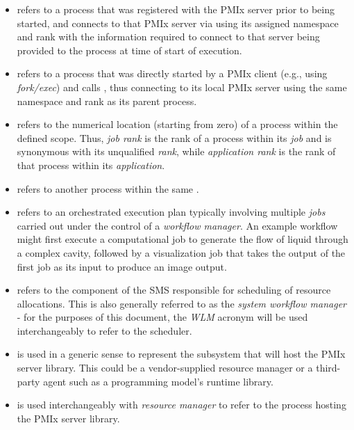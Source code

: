 \begin{itemize}
\item {} refers to a process that was registered with the \ac{PMIx} server prior to being started, and connects to that \ac{PMIx} server via  using its assigned namespace and rank with the information required to connect to that server being provided to the process at time of start of execution.

\item {} refers to a process that was directly started by a \ac{PMIx} client (e.g., using \emph{fork/exec}) and calls , thus connecting to its local \ac{PMIx} server using the same namespace and rank as its parent process.

\item {} refers to the numerical location (starting from zero) of a process within the defined scope. Thus, \emph{job rank} is the rank of a process within its \emph{job} and is synonymous with its unqualified \emph{rank}, while \emph{application rank} is the rank of that process within its \emph{application}.

\item {} refers to another process within the same .

\item {} refers to an orchestrated execution plan typically involving multiple \emph{jobs} carried out under the control of a \emph{workflow manager}. An example workflow might first execute a computational job to generate the flow of liquid through a complex cavity, followed by a visualization job that takes the output of the first job as its input to produce an image output.

\item {} refers to the component of the \ac{SMS} responsible for scheduling of resource allocations. This is also generally referred to as the \emph{system workflow manager} - for the purposes of this document, the \emph{WLM} acronym will be used interchangeably to refer to the scheduler.

\item {} is used in a generic sense to represent the subsystem that will host the \ac{PMIx} server library. This could be a vendor-supplied resource manager or a third-party agent such as a programming model's runtime library.

\item {} is used interchangeably with \emph{resource manager} to refer to the process hosting the \ac{PMIx} server library.


\end{itemize}
